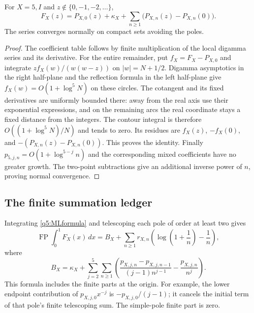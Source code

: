 \begin{lemma}
\label{q5:ML}
For $X=5,I$ and $z\notin\{0,-1,-2,\ldots\}$,
\begin{equation}\label{q5:MLformula}
 F_X(z)=P_{X,0}(z)+\kappa_X+
       \sum_{n\geq1}\bigl(P_{X,n}(z)-P_{X,n}(0)\bigr).
\end{equation}
The series converges normally on compact sets avoiding the poles.
\end{lemma}
\begin{proof}
The coefficient table follows by finite multiplication of the local
digamma series and its derivative.  For the entire remainder, put
$f_X=F_X-P_{X,0}$ and integrate
$z f_X(w)/(w(w-z))$ on $|w|=N+1/2$.
Digamma asymptotics in the right half-plane and the reflection formula
in the left half-plane give $f_X(w)=O(1+\log^5N)$ on these circles.
The cotangent and its fixed derivatives are uniformly bounded there:
away from the real axis use their exponential expressions, and on the
remaining arcs the real coordinate stays a fixed distance from the
integers.  The contour integral is therefore
$O((1+\log^5N)/N)$ and tends to zero.
Its residues are $f_X(z)$, $-f_X(0)$, and
$-(P_{X,n}(z)-P_{X,n}(0))$.  This proves the identity.
Finally $p_{5,j,n}=O(1+\log^{5-j}n)$ and the corresponding mixed
coefficients have no greater growth.  The two-point subtractions give
an additional inverse power of $n$, proving normal convergence.
\end{proof}

\subsection{The finite summation ledger}

Integrating \eqref{q5:MLformula} and telescoping each pole of order
at least two gives
\begin{equation}\label{q5:integrated}
 \operatorname{FP}\int_0^1F_X(x)\,dx
   =B_X+\sum_{n\geq1}r_{X,n}
        \left(\log\left(1+\frac1n\right)-\frac1n\right),
\end{equation}
where
\begin{equation}\label{q5:Bmechanism}
 B_X=\kappa_X+
  \sum_{j=2}^5\sum_{n\geq1}
    \left(\frac{p_{X,j,n}-p_{X,j,n-1}}{(j-1)n^{j-1}}
                       -\frac{p_{X,j,n}}{n^j}\right).
\end{equation}
This formula includes the finite parts at the origin.  For example,
the lower endpoint contribution of $p_{X,j,0}x^{-j}$ is
$-p_{X,j,0}/(j-1)$; it cancels the initial term of that pole's finite
telescoping sum.  The simple-pole finite part is zero.

